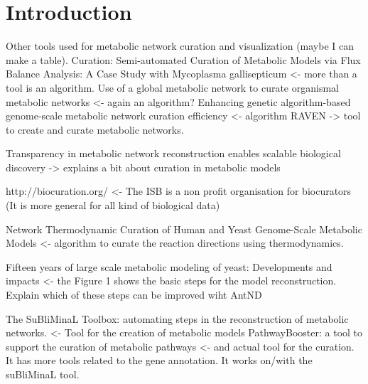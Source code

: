 \section{Introduction}

Other tools used for metabolic network curation and visualization (maybe I can make a table).
Curation: 
Semi-automated Curation of Metabolic Models via Flux Balance Analysis: A Case Study with Mycoplasma gallisepticum <- more than a tool is an algorithm.
Use of a global metabolic network to curate organismal metabolic networks <- again an algorithm?
Enhancing genetic algorithm-based genome-scale metabolic network curation efficiency <- algorithm
RAVEN -> tool to create and curate metabolic networks.

Transparency in metabolic network reconstruction enables scalable biological discovery -> explains a bit about curation in metabolic models

http://biocuration.org/ <- The ISB is a non profit organisation for biocurators (It is more general for all kind of biological data)

Network Thermodynamic Curation of Human and Yeast Genome-Scale Metabolic Models <- algorithm to curate the reaction directions using thermodynamics.

Fifteen years of large scale metabolic modeling of yeast: Developments and impacts <- the Figure 1 shows the basic steps for the model reconstruction. Explain which of these steps can be improved wiht AntND

The SuBliMinaL Toolbox: automating steps in the reconstruction of metabolic networks. <- Tool for the creation of metabolic models
PathwayBooster: a tool to support the curation of metabolic pathways <- and actual tool for the curation. It has more tools related to the gene annotation. It works on/with the suBliMinaL tool.
